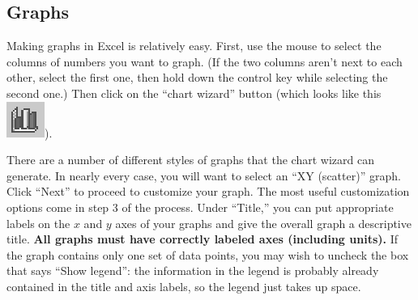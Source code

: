 {\par\centering {} \par}


\subsection{Graphs}

Making graphs in Excel is relatively easy.  First, use the mouse
to select the columns of numbers you want to graph.  (If the two
columns aren't next to each other, select the first one, then hold
down the control key while selecting the second one.)
Then click on the ``chart wizard'' button (which looks like this
\includegraphics{bargraph.eps}).  

There are a number of different styles of graphs that the chart wizard
can generate.  In nearly every case, you will want to select an
``XY (scatter)'' graph.  Click ``Next'' to proceed to customize
your graph.  The most useful customization options come in step 3
of the process.  Under ``Title,'' you can put appropriate labels
on the $x$ and $y$ axes of your graphs and give the overall graph
a descriptive title.  \textbf{All graphs must have correctly labeled
axes (including units).}  If the graph contains only one set of data
points, you may wish to uncheck the box that says ``Show legend'':
the information in the legend is probably already contained in the
title and axis labels, so the legend just takes up space.

